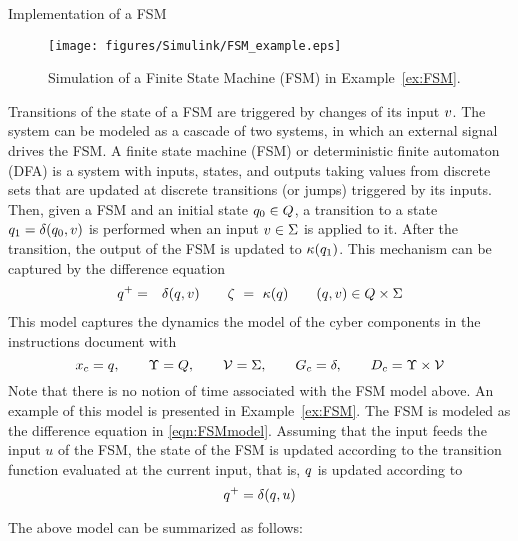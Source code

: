 \begin{example}{Implementation of a FSM}\label{ex:FSM}

\begin{figure}
  \begin{center}
    {\texttt{[image: figures/Simulink/FSM\_example.eps]}}
   \caption{Simulation of a Finite State Machine (FSM) in Example~\ref{ex:FSM}.}
\label{fig:FSM_example}
  \end{center}
\end{figure}

Transitions of the state of a FSM are triggered by changes of its input $v$.
The system can be modeled as a cascade of two systems,
in which an external signal drives the FSM. 
\IfSAE
{
A finite state machine (FSM) or deterministic finite automaton (DFA) is a system with
inputs, states, and outputs taking values from discrete sets that are updated at discrete transitions (or jumps)
triggered by its inputs. 
Then, given a FSM and an initial state $q_0 \in Q$,  
a transition to a state $q_1 = \delta(q_0,v)$ is performed
when an input $v \in \Sigma$ is applied to it.
After the transition, the output of the FSM is updated to $\kappa(q_1)$.
This mechanism can be captured by the difference equation
\begin{eqnarray}\label{eqn:FSMmodel}
\xlogic^+ & = & \delta(\xlogic,\uc)  \qquad \yc \ = \ \hc(\xlogic) \qquad (\xlogic,\uc)  \in \xlogicSpace \times \Sigma
\end{eqnarray}
This model captures the dynamics
the model of the cyber components 
in the instructions document
with
$$
x_c = q, \qquad \Upsilon = Q, \qquad {\cal V} = \Sigma, \qquad G_c = \delta, \qquad D_c = \Upsilon\times{\cal V}
$$
Note that there is no notion of time associated with the FSM model above. An example of this model is presented in Example~\ref{ex:FSM}. 
}
{The FSM is modeled as the difference equation in \eqref{eqn:FSMmodel}.}
Assuming that the input feeds the input $u$ of the FSM, 
the state of the FSM is updated according to the transition function evaluated at the current input, that is,
$q$ is updated according to
 $$
q^+  =  \delta(q,u)
$$

The above model can be summarized as follows:


\end{example}
